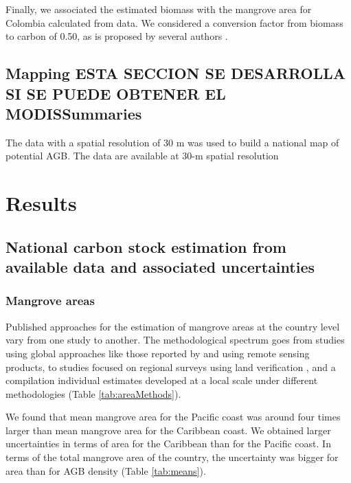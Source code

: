 \documentclass[review, authoryear]{elsarticle}   	%
\begin{document}
Finally, we associated the estimated biomass with the mangrove area for Colombia calculated from \citet{Giri2013, Giri2010} data. We considered a conversion factor from biomass to carbon of 0.50, as is proposed by several authors \citep{MacDicken1997, Clark2001, Fearnside2004, Chave2005, Aragao2009}.

\subsection{Mapping ESTA SECCION SE DESARROLLA SI SE PUEDE OBTENER EL MODISSummaries}

The data with a spatial resolution of 30 m was used to build a national map of potential AGB. 
The data are available at 30-m spatial resolution


\section{Results}

\subsection{National carbon stock estimation from available data and associated uncertainties}
\subsubsection{Mangrove areas}
Published approaches for the estimation of mangrove areas at the country level vary from one study to another. The methodological spectrum goes from studies using global approaches like those reported by  \citet{Giri2013, Giri2010} and  \citet{CONL:CONL12060} using remote sensing products,  to studies focused on regional surveys using land verification  \citep{FAO2007}, and a compilation individual estimates developed at a local scale under different methodologies \citet{INVEMAR2014} (Table \ref{tab:areaMethods}). 

We found that mean mangrove area for the Pacific coast was around four times larger than mean mangrove area for the Caribbean coast. We obtained larger uncertainties in terms of area for the Caribbean than for the Pacific coast. In terms of the total mangrove area of the country, the uncertainty was bigger for area than for AGB density (Table \ref{tab:means}).
\end{document}
